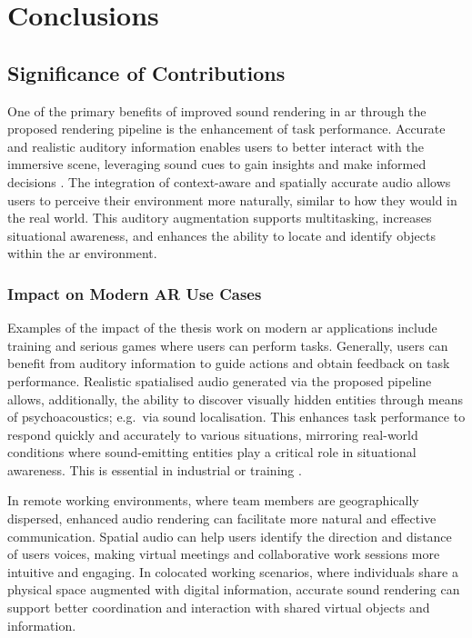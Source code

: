 \section{Conclusions}

\subsection{Significance of Contributions}

One of the primary benefits of improved sound rendering in \acrshort{ar} through the proposed rendering pipeline is the enhancement of task performance. Accurate and realistic auditory information enables users to better interact with the immersive scene, leveraging sound cues to gain insights and make informed decisions \citep{rubio2017immersive,zimmons2003influence}. The integration of context-aware and spatially accurate audio allows users to perceive their environment more naturally, similar to how they would in the real world. This auditory augmentation supports multitasking, increases situational awareness, and enhances the ability to locate and identify objects within the \acrshort{ar} environment. 

\subsubsection{Impact on Modern AR Use Cases}
Examples of the impact of the thesis work on modern \acrshort{ar} applications include training and serious games where users can perform tasks. Generally, users can benefit from auditory information to guide actions and obtain feedback on task performance. Realistic spatialised audio generated via the proposed pipeline allows, additionally, the ability to discover visually hidden entities through means of psychoacoustics; e.g.\ via sound localisation. This enhances task performance to respond quickly and accurately to various situations, mirroring real-world conditions where sound-emitting entities play a critical role in situational awareness. This is essential in industrial \citep{machala2022application} or training \citep{vine2023training, soltani2020augmented}.

In remote working environments, where team members are geographically dispersed, enhanced audio rendering can facilitate more natural and effective communication. Spatial audio can help users identify the direction and distance of users voices, making virtual meetings and collaborative work sessions more intuitive and engaging. In colocated working scenarios, where individuals share a physical space augmented with digital information, accurate sound rendering can support better coordination and interaction with shared virtual objects and information.


